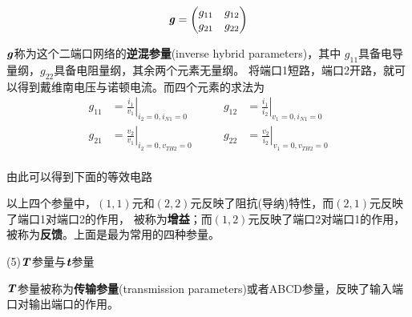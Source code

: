     \[
    \textbf{\textit{g}}=
    \begin{pmatrix}
        g_{11} & g_{12} \\
        g_{21} & g_{22} \\
    \end{pmatrix}
    \]
    \par $\textbf{\textit{g}}$称为这个二端口网络的\textbf{逆混参量}(inverse hybrid parameters)，其中
    $g_{11}$具备电导量纲，$g_{22}$具备电阻量纲，其余两个元素无量纲。
    将端口1短路，端口2开路，就可以得到戴维南电压与诺顿电流。而四个元素的求法为
    \begin{align*}
        g_{11}&=\left.\frac{i_1}{v_1}\right|_{i_2=0,i_{N1}=0} \qquad&
        g_{12}&=\left.\frac{i_1}{i_2}\right|_{v_1=0,i_{N1}=0} \\
        g_{21}&=\left.\frac{v_2}{v_1}\right|_{i_2=0,v_{TH2}=0} \qquad&
        g_{22}&=\left.\frac{v_2}{i_2}\right|_{v_1=0,v_{TH2}=0} \\
    \end{align*}
    \par 由此可以得到下面的等效电路
    \begin{center}
        \qquad
    \end{center}
    \par 以上四个参量中，$(1,1)$元和$(2,2)$元反映了阻抗(导纳)特性，而$(2,1)$元反映了端口1对端口2的作用，
    被称为\textbf{增益}；而$(1,2)$元反映了端口2对端口1的作用，被称为\textbf{反馈}。上面是最为常用的四种参量。
    \par (5)$\textbf{\textit{T}}$参量与$\textbf{\textit{t}}$参量
    \par $\textbf{\textit{T}}$参量被称为\textbf{传输参量}(transmission parameters)或者ABCD参量，反映了输入端口对输出端口的作用。
